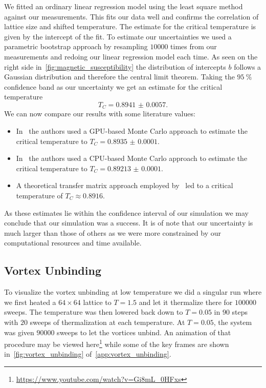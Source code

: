We fitted an ordinary linear regression model using the least square method against our measurements. This fits our data well and confirms the correlation of lattice size and shifted temperature. The estimate for the critical temperature is given by the intercept of the fit. To estimate our uncertainties we used a parametric bootstrap approach by resampling $\num{10 000}$ times from our measurements and redoing our linear regression model each time. As seen on the right side in~\cref{fig:magnetic_susceptibility} the distribution of intercepts $b$ follows a Gaussian distribution and therefore the central limit theorem. Taking the $\SI{95}{\percent}$ confidence band as our uncertainty we get an estimate for the critical temperature
\begin{equation}
	T_C = \num{0.8941(57)}.
\end{equation}
We can now compare our results with some literature values:
\begin{itemize}
	\item In~\citet{literature_gpu} the authors used a GPU-based Monte Carlo approach to estimate the critical temperature to $T_C=\num{0.8935(1)}$.
	\item In~\citet{literature_cpu} the authors used a CPU-based Monte Carlo approach to estimate the critical temperature to $T_C=\num{0.89213(10)}$.
	\item A theoretical transfer matrix approach employed by~\cite{literature_theo} led to a critical temperature of $T_C \approx \num{0.8916}$.
\end{itemize}
As these estimates lie within the confidence interval of our simulation we may conclude that our simulation was a success. It is of note that our uncertainty is much larger than those of others as we were more constrained by our computational resources and time available.

\subsection{Vortex Unbinding}\label{sec:vortex_unbinding}
To visualize the vortex unbinding at low temperature we did a singular run where we first heated a $64 \times 64$ lattice  to $T = \num{1.5}$ and let it thermalize there for $\num{100 000}$ sweeps. The temperature was then lowered back down to $T = \num{0.05}$ in $90$ steps with $20$ sweeps of thermalization at each temperature. At $T = \num{0.05}$, the system was given $\num{90 000}$ sweeps to let the vortices unbind. An animation of that procedure may be viewed here\footnote{\url{https://www.youtube.com/watch?v=Gi8mL_0HFxs}} while some of the key frames are shown in~\cref{fig:vortex_unbinding} of~\cref{app:vortex_unbinding}.

